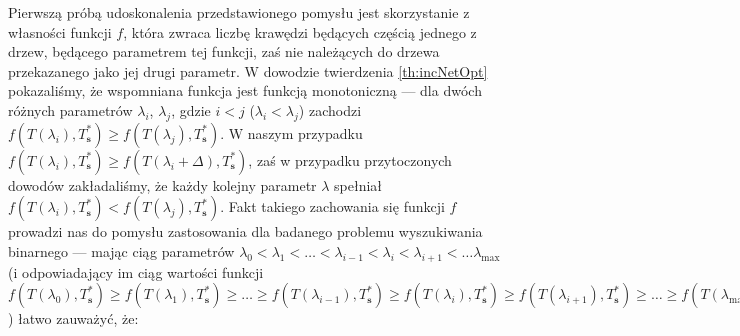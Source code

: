 {Pierwszą próbą udoskonalenia przedstawionego pomysłu jest skorzystanie z własności funkcji $f$, która zwraca liczbę krawędzi będących częścią jednego z drzew, będącego parametrem tej funkcji, zaś nie należących do drzewa przekazanego jako jej drugi parametr. W dowodzie twierdzenia \ref{th:incNetOpt} pokazaliśmy, że wspomniana funkcja jest funkcją monotoniczną --- dla dwóch różnych parametrów $\lambda_{i}$, $\lambda_{j}$, gdzie $i < j$ ($\lambda_{i} < \lambda_{j}$) zachodzi $f \left( T \left( \lambda_{i} \right), T^{\ast}_{\textbf{s}} \right) \geqslant f \left( T \left( \lambda_{j} \right), T^{\ast}_{\textbf{s}} \right)$. W naszym przypadku $f \left( T \left( \lambda_{i} \right), T^{\ast}_{\textbf{s}} \right) \geqslant f \left( T \left( \lambda_{i} + \Delta \right), T^{\ast}_{\textbf{s}} \right)$, zaś w przypadku przytoczonych dowodów zakładaliśmy, że każdy kolejny parametr $\lambda$ spełniał $f \left( T \left( \lambda_{i} \right), T^{\ast}_{\textbf{s}} \right) < f \left( T \left( \lambda_{j} \right), T^{\ast}_{\textbf{s}} \right)$. Fakt takiego zachowania się funkcji $f$ prowadzi nas do pomysłu zastosowania dla badanego problemu wyszukiwania binarnego --- mając ciąg parametrów $\lambda_{0} < \lambda_{1} < \dots < \lambda_{i-1} < \lambda_{i} < \lambda_{i+1} < \dots \lambda_{\text{max}}$ (i odpowiadający im ciąg wartości funkcji $f \left( T \left( \lambda_{0} \right), T^{\ast}_{\textbf{s}} \right) \geqslant f \left( T \left( \lambda_{1} \right), T^{\ast}_{\textbf{s}} \right) \geqslant \dots \geqslant f \left( T \left( \lambda_{i-1} \right), T^{\ast}_{\textbf{s}} \right) \geqslant f \left( T \left( \lambda_{i} \right), T^{\ast}_{\textbf{s}} \right) \geqslant f \left( T \left( \lambda_{i+1} \right), T^{\ast}_{\textbf{s}} \right) \geqslant \dots \geqslant f \left( T \left( \lambda_{\text{max}} \right), T^{\ast}_{\textbf{s}} \right)$) łatwo zauważyć, że:

}
